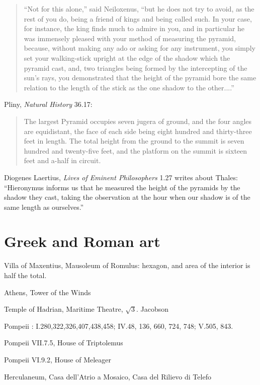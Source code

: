 \documentclass{article}
\theoremstyle{definition}
\begin{document}
\begin{quote}
``Not for this alone,'' said Neiloxenus, ``but he does not try to avoid, as the rest of you do, being a friend of kings and being called such.
In your case, for instance, the king finds much to admire in you, and in particular he was immensely pleased with your method of measuring the pyramid, because, without
making any ado or asking for any instrument, you simply set your walking-stick upright at the edge of the shadow which the pyramid cast, and, two triangles being formed by the 
intercepting of the sun's rays, you demonstrated that the height of the pyramid bore the same relation to the length of the stick as the one shadow to the other....''
\end{quote}

Pliny, {\em Natural History} 36.17:

\begin{quote}
The largest Pyramid occupies seven jugera of ground, and the four angles are equidistant, the face of each side being eight hundred and thirty-three feet in length. The total height from the ground to the summit is seven hundred and twenty-five feet, and the platform on the summit is sixteen feet and a-half in circuit.
\end{quote}

Diogenes Laertius, {\em Lives of Eminent Philosophers} 1.27 writes about Thales: ``Hieronymus informs us that he measured the height of the pyramids by the shadow they cast, taking the observation at the hour when our
shadow is of the same length as ourselves.''







\section{Greek and Roman art}
Villa of Maxentius, Mausoleum of Romulus: hexagon, and area of the interior is half the total.

Athens, Tower of the Winds

Temple of Hadrian,  Maritime Theatre, $\sqrt{3}$. Jacobson \cite{jacobson}

Pompeii \cite{pompei}: I.280,322,326,407,438,458; IV.48, 136, 660, 724, 748; V.505, 843.

Pompeii VII.7.5, House of Triptolemus 

Pompeii VI.9.2, House of Meleager

Herculaneum, Casa dell'Atrio a Mosaico, Casa del Rilievo di Telefo
\end{document}
